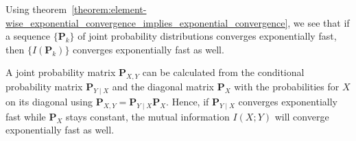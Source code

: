 \documentclass[../../main.tex]{subfiles}
\begin{document}
\begin{corollary}
    Using theorem~\ref{theorem:element-wise_exponential_convergence_implies_exponential_convergence}, we see that if a sequence $\{\bm{P}_k\}$ of joint probability distributions converges exponentially fast, then $\{I(\bm{P}_k)\}$ converges exponentially fast as well.
\end{corollary}

\begin{corollary}
    \label{corollary:exponential_convergence_of_conditional_probability_matrix_implies_exponential_convergence_of_mutual_information}
    A joint probability matrix $\bm{P}_{X,Y}$ can be calculated from the conditional probability matrix $\bm{P}_{Y \mid X}$ and the diagonal matrix $\bm{P}_{X}$ with the probabilities for $X$ on its diagonal using $\bm{P}_{X,Y} = \bm{P}_{Y \mid X} \bm{P}_{X}$. Hence, if $\bm{P}_{Y \mid X}$ converges exponentially fast while $\bm{P}_X$ stays constant, the mutual information $I(X;Y)$ will converge exponentially fast as well.
\end{corollary}
\end{document}
